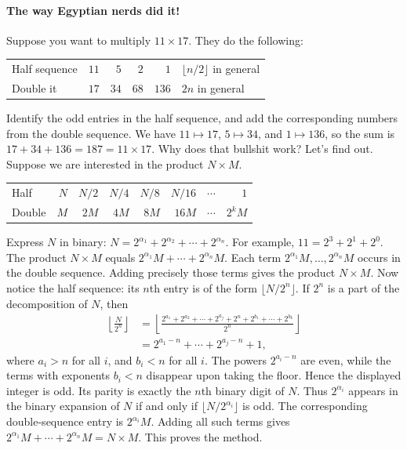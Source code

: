 \documentclass[11pt,a4paper]{article}
\begin{document}
\paragraph{The way Egyptian nerds did it!}
Suppose you want to multiply $11\times17$. They do the following:
\begin{center}
\begin{tabular}{lrrrrl}
Half sequence & $\boxed{11}$ & $\boxed5$ & $2$ & $\boxed1$ & $\lfloor n/2\rfloor$ in general\\
Double it & $17$ & $34$ & $68$ & $136$ & $2n$ in general
\end{tabular}
\end{center}
Identify the odd entries in the half sequence, and add the corresponding numbers from the double sequence.
We have $11\mapsto17$, $5\mapsto34$, and $1\mapsto136$, so the sum is $17+34+136=187=11\times17$.
Why does that bullshit work? Let's find out.
Suppose we are interested in the product $N\times M$.
\begin{center}
\begin{tabular}{lrrrrrrr}
Half & $N$ & $N/2$ & $N/4$ & $N/8$ & $N/16$ & $\cdots$ & $1$\\
Double & $M$ & $2M$ & $4M$ & $8M$ & $16M$ & $\cdots$ & $2^kM$
\end{tabular}
\end{center}
Express $N$ in binary: $N=2^{\alpha_1}+2^{\alpha_2}+\cdots+2^{\alpha_n}$.
For example, $11=2^3+2^1+2^0$.
The product $N\times M$ equals $2^{\alpha_1}M+\cdots+2^{\alpha_n}M$.
Each term $2^{\alpha_1}M,\ldots,2^{\alpha_n}M$ occurs in the double sequence.
Adding precisely those terms gives the product $N\times M$.
Now notice the half sequence: its $n$th entry is of the form
$\lfloor N/2^n\rfloor$. If $2^n$ is a part of the decomposition of $N$, then
\[
\begin{aligned}
\left\lfloor\frac N{2^n}\right\rfloor
&=\left\lfloor
\frac{2^{a_1}+2^{a_2}+\cdots+2^{a_j}+2^n
      +2^{b_1}+\cdots+2^{b_k}}{2^n}\right\rfloor\\
&=2^{a_1-n}+\cdots+2^{a_j-n}+1,
\end{aligned}
\]
where $a_i>n$ for all $i$, and $b_i<n$ for all $i$.
The powers $2^{a_i-n}$ are even, while the terms with exponents $b_i<n$
disappear upon taking the floor. Hence the displayed integer is odd.
Its parity is exactly the $n$th binary digit of $N$.
Thus $2^{\alpha_i}$ appears in the binary expansion of $N$ if and only if $\lfloor N/2^{\alpha_i}\rfloor$ is odd.
The corresponding double-sequence entry is $2^{\alpha_i}M$.
Adding all such terms gives $2^{\alpha_1}M+\cdots+2^{\alpha_n}M=N\times M$.
This proves the method.
\end{document}
